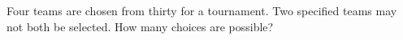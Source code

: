 Four teams are chosen from thirty for a tournament. Two specified teams may not both be selected. How many choices are possible?
